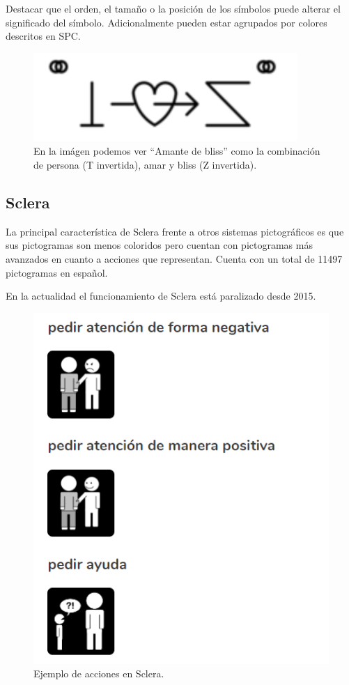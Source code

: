  Destacar que el orden, el tamaño o la posición de los símbolos puede alterar el significado del símbolo. Adicionalmente pueden estar agrupados por colores descritos en SPC.


\begin{figure}[h!]
	\centering
	\includegraphics[width=0.3\linewidth]{Imagenes/Bitmap/Blissymbolics}
	\caption{En la imágen podemos ver “Amante de bliss” como la combinación de persona (T invertida), amar y bliss (Z invertida).}
	\label{fig:blissymbolics}
\end{figure}


\subsection{Sclera}
La principal característica de Sclera frente a otros sistemas pictográficos es que sus pictogramas son menos coloridos pero cuentan con pictogramas más avanzados en cuanto a acciones que representan. Cuenta con un total de 11497 pictogramas en español.

En la actualidad el funcionamiento de Sclera está paralizado desde 2015.

\begin{figure}[h!]
	\centering
	\includegraphics[scale=0.4]{Imagenes/Bitmap/Sclera}
	\caption{Ejemplo de acciones en Sclera.}
	\label{fig:sclera}
\end{figure}

